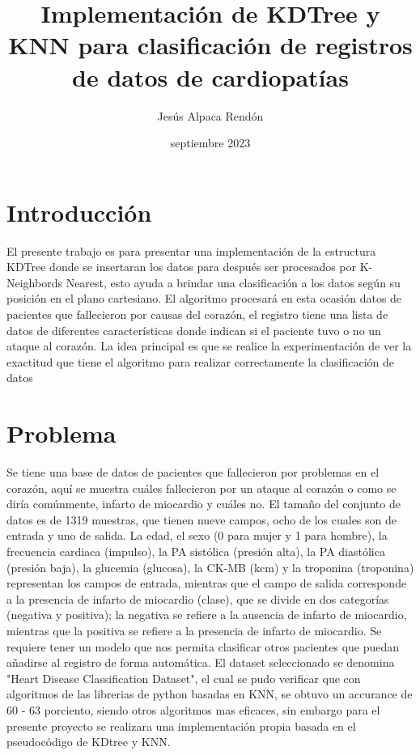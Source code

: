 \documentclass[12pt]{article} %
\title{Implementación de KDTree y KNN para clasificación de registros de datos de cardiopatías}
\date{septiembre 2023}
\author{Jesús Alpaca Rendón}
\begin{document}
\maketitle
\section{Introducción}

El presente trabajo es para presentar una implementación de la estructura KDTree donde se insertaran los datos para después ser procesados
por K-Neighbords Nearest, esto ayuda a brindar una clasificación a los datos según su posición en el plano cartesiano. El algoritmo procesará
en esta ocasión datos de pacientes que fallecieron por causas del corazón, el registro tiene una lista de datos de diferentes características
donde indican si el paciente tuvo o no un ataque al corazón.
La idea principal es que se realice la experimentación de ver la exactitud que tiene el algoritmo para realizar correctamente la clasificación de datos

\section{Problema}

Se tiene una base de datos de pacientes que fallecieron por problemas en el corazón, aquí se muestra cuáles fallecieron por un ataque al corazón o como se diría comúnmente, infarto de miocardio y cuáles no.
El tamaño del conjunto de datos es de 1319 muestras, que tienen nueve campos, ocho de los cuales son de entrada y uno de salida. La edad,
el sexo (0 para mujer y 1 para hombre), la frecuencia cardiaca (impulso), la PA sistólica (presión alta), la PA diastólica (presión baja),
la glucemia (glucosa), la CK-MB (kcm) y la troponina (troponina) representan los campos de entrada, mientras que el campo de salida corresponde a la presencia
de infarto de miocardio (clase), que se divide en dos categorías (negativa y positiva); la negativa se refiere a la ausencia de infarto de miocardio, mientras que la positiva se refiere a la presencia de infarto de miocardio.
Se requiere tener un modelo que nos permita clasificar otros pacientes que puedan añadirse al registro de forma automática.
El dataset seleccionado se denomina "Heart Disease Classification Dataset", el cual se pudo verificar que con algoritmos de las librerias de python basadas en KNN, se obtuvo un accurance de 60 - 63 porciento, siendo otros algoritmos
mas eficaces, sin embargo para el presente proyecto se realizara una implementación propia basada en el pseudocódigo de KDtree y KNN.
\end{document}
